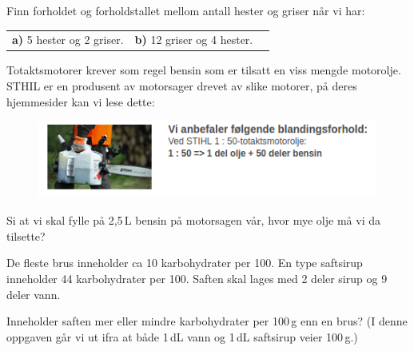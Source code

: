  \vs
{}

Finn forholdet og forholdstallet mellom antall hester og griser når vi har:\os
\begin{tabular}{@{}l l l}	
	\textbf{a)} 5 hester og 2 griser. &\textbf{b)} 12 griser og 4 hester.
\end{tabular}

Totaktsmotorer krever som regel bensin som er tilsatt en viss mengde motorolje. STHIL er en produsent av motorsager drevet av slike motorer, på deres hjemmesider kan vi lese dette:
\begin{figure}
	\includegraphics[]{stihl}
\end{figure}
Si at vi skal fylle på 2,5\,L bensin på motorsagen vår, hvor mye olje må vi da tilsette?

\vsk \vspace{12pt}

\newpage



De fleste brus inneholder ca 10 karbohydrater per 100. En type saftsirup inneholder 44 karbohydrater per 100. Saften skal lages med 2 deler sirup og 9 deler vann. \os

Inneholder saften mer eller mindre karbohydrater per 100\,g enn en brus? (I denne oppgaven går vi ut ifra at både 1\,dL vann og 1\,dL saftsirup veier 100\,g.)



